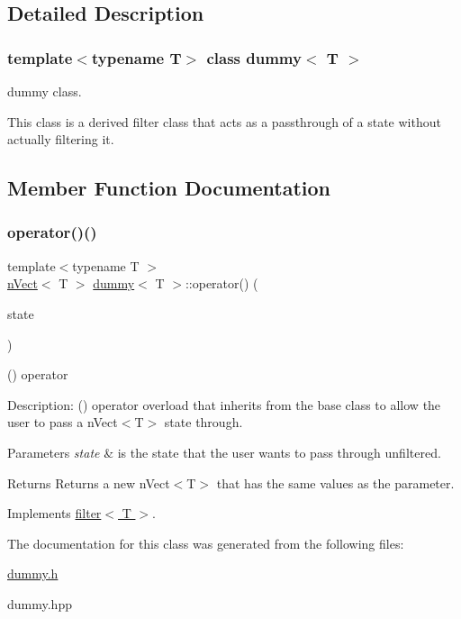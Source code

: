 \subsection{Detailed Description}
\subsubsection*{template$<$typename T$>$\newline
class dummy$<$ T $>$}

dummy class. 

This class is a derived filter class that acts as a passthrough of a state without actually filtering it. 

\subsection{Member Function Documentation}
\mbox{\label{classdummy_a437aae6ce48cad80944cb578aa0c0218}} 
\subsubsection{\texorpdfstring{operator()()}{operator()()}}
{\footnotesize\ttfamily template$<$typename T $>$ \\
\hyperlink{classnVect}{n\+Vect}$<$ T $>$ \hyperlink{classdummy}{dummy}$<$ T $>$\+::operator() (\begin{DoxyParamCaption}\item[{\hyperlink{classnVect}{n\+Vect}$<$ T $>$ \&}]{state }\end{DoxyParamCaption})\hspace{0.3cm}{\ttfamily [virtual]}}



() operator 

Description\+: () operator overload that inherits from the base class to allow the user to pass a n\+Vect$<$\+T$>$ state through. 
\begin{DoxyParams}{Parameters}
{\em state} & is the state that the user wants to pass through unfiltered. \\
\hline
\end{DoxyParams}
\begin{DoxyReturn}{Returns}
Returns a new n\+Vect$<$\+T$>$ that has the same values as the parameter. 
\end{DoxyReturn}


Implements \hyperlink{classfilter_ac8ec0fb4a10d10ee5e3133259610e0d2}{filter$<$ T $>$}.



The documentation for this class was generated from the following files\+:\begin{DoxyCompactItemize}
\item 
\hyperlink{dummy_8h}{dummy.\+h}\item 
dummy.\+hpp\end{DoxyCompactItemize}
